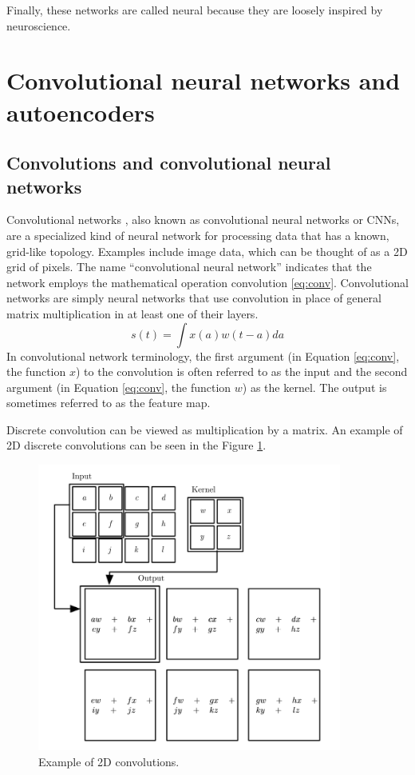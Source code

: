 Finally, these networks are called neural because they are loosely inspired by neuroscience.

\section{Convolutional neural networks and autoencoders}

\subsection{Convolutions and convolutional neural networks}

Convolutional networks \cite{6795724}, also known as convolutional neural networks or CNNs, are a specialized kind of neural network for processing data that has a known, grid-like topology. Examples include image data,
which can be thought of as a 2D grid of pixels. The name “convolutional neural network” indicates that the network employs the mathematical operation convolution \ref{eq:conv}. Convolutional networks are simply neural networks that use convolution in place of general matrix multiplication in at least one of their layers.
\begin{equation}\label{eq:conv}
    s(t) = \int x(a)w(t-a)da
\end{equation}
In convolutional network terminology, the ﬁrst argument (in Equation \ref{eq:conv}, the function $x$) to the convolution is often referred to as the input and the second argument (in Equation \ref{eq:conv}, the function $w$) as the kernel. The output is sometimes referred to as the feature map.

Discrete convolution can be viewed as multiplication by a matrix. An example of 2D discrete convolutions can be seen in the Figure \ref{fig:conv}. 

\begin{figure}[h!]
    \centering
    \includegraphics[width=10cm]{images/conv2D.png}
    \caption{Example of 2D convolutions.}
    \label{fig:conv}
\end{figure}

